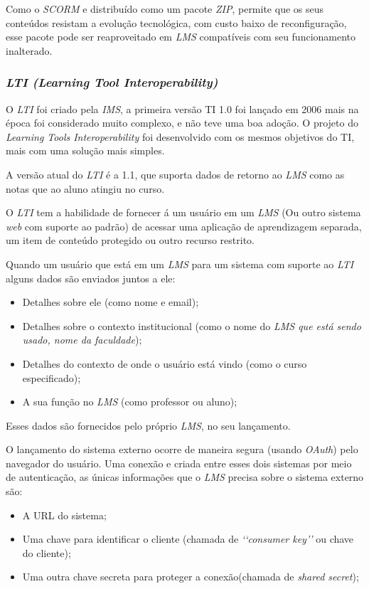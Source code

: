 Como o \textit{SCORM} e distribuído como um pacote \textit{ZIP}, permite que os seus conteúdos resistam a evolução tecnológica, com custo baixo de reconfiguração, esse pacote pode ser reaproveitado em \textit{LMS} compatíveis com seu funcionamento inalterado.

\subsubsection{\textit{LTI (Learning Tool Interoperability)}}
\label{sec:lti}
O \textit{LTI} foi criado pela \textit{IMS}, a primeira versão TI 1.0 foi lançado em 2006 mais na época foi considerado muito complexo, e não teve uma boa adoção. O projeto do \textit{Learning Tools Interoperability} foi desenvolvido com os mesmos objetivos do TI, mais com uma solução mais simples. \cite{ims}

A versão atual do \textit{LTI} é a 1.1, que suporta dados de retorno ao \textit{LMS} como as notas que ao aluno atingiu no curso.

\begin{citacao}
  O \textit{LTI} tem a habilidade de fornecer á um usuário em um \textit{LMS} (Ou outro sistema \textit{web} com suporte ao padrão) de acessar uma aplicação de aprendizagem separada, um item de conteúdo protegido ou outro recurso restrito. \cite[p.~2, tradução nossa]{vickers-ims}
\end{citacao}

Quando um usuário que está em um \textit{LMS} para um sistema com suporte ao \textit{LTI} alguns dados são enviados juntos a ele:
\begin{itemize}
    \item Detalhes sobre ele (como nome e email);
    \item Detalhes sobre o contexto institucional (como o nome do \textit{LMS que está sendo usado, nome da faculdade});
    \item Detalhes do contexto de onde o usuário está vindo (como o curso especificado);
    \item A sua função no \textit{LMS} (como professor ou aluno);
\end{itemize}
Esses dados são fornecidos pelo próprio \textit{LMS}, no seu lançamento.

O lançamento do sistema externo ocorre de maneira segura (usando \textit{OAuth}) pelo navegador do usuário. Uma conexão e criada entre esses dois sistemas por meio de autenticação, as únicas informações que o \textit{LMS} precisa sobre o sistema externo são:
\begin{itemize}
    \item A \ac{URL} do sistema;
    \item Uma chave para identificar o cliente (chamada de \textit{\lq\lq consumer key\rq\rq} ou chave do cliente);
    \item Uma outra chave secreta para proteger a conexão(chamada de \textit{shared secret});
\end{itemize}

